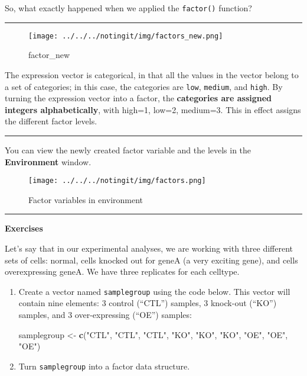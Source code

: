 \documentclass[
]{article}
\newenvironment{Shaded}{\begin{snugshade}}{\end{snugshade}}
\newcommand{\KeywordTok}[1]{\textcolor[rgb]{0.13,0.29,0.53}{\textbf{#1}}}
\newcommand{\NormalTok}[1]{#1}
\newcommand{\StringTok}[1]{\textcolor[rgb]{0.31,0.60,0.02}{#1}}
\begin{document}
So, what exactly happened when we applied the \texttt{factor()}
function?

\begin{center}\rule{0.5\linewidth}{0.5pt}\end{center}

\begin{figure}
\centering
\texttt{[image: ../../../notingit/img/factors\_new.png]}
\caption{factor\_new}
\end{figure}

The expression vector is categorical, in that all the values in the
vector belong to a set of categories; in this case, the categories are
\texttt{low}, \texttt{medium}, and \texttt{high}. By turning the
expression vector into a factor, the \textbf{categories are assigned
integers alphabetically}, with high=1, low=2, medium=3. This in effect
assigns the different factor levels.

\begin{center}\rule{0.5\linewidth}{0.5pt}\end{center}

You can view the newly created factor variable and the levels in the
\textbf{Environment} window.

\begin{figure}
\centering
\texttt{[image: ../../../notingit/img/factors.png]}
\caption{Factor variables in environment}
\end{figure}

\begin{center}\rule{0.5\linewidth}{0.5pt}\end{center}

\textbf{Exercises}

Let's say that in our experimental analyses, we are working with three
different sets of cells: normal, cells knocked out for geneA (a very
exciting gene), and cells overexpressing geneA. We have three replicates
for each celltype.

\begin{enumerate}
\def\labelenumi{\arabic{enumi}.}
\item
  Create a vector named \texttt{samplegroup} using the code below. This
  vector will contain nine elements: 3 control (``CTL'') samples, 3
  knock-out (``KO'') samples, and 3 over-expressing (``OE'') samples:

\begin{Shaded}
\begin{Highlighting}[]
\NormalTok{samplegroup <-}\StringTok{ }\KeywordTok{c}\NormalTok{(}\StringTok{"CTL"}\NormalTok{, }\StringTok{"CTL"}\NormalTok{, }\StringTok{"CTL"}\NormalTok{, }\StringTok{"KO"}\NormalTok{, }\StringTok{"KO"}\NormalTok{, }\StringTok{"KO"}\NormalTok{, }\StringTok{"OE"}\NormalTok{, }\StringTok{"OE"}\NormalTok{, }\StringTok{"OE"}\NormalTok{)}
\end{Highlighting}
\end{Shaded}
\item
  Turn \texttt{samplegroup} into a factor data structure.
\end{enumerate}
\end{document}
